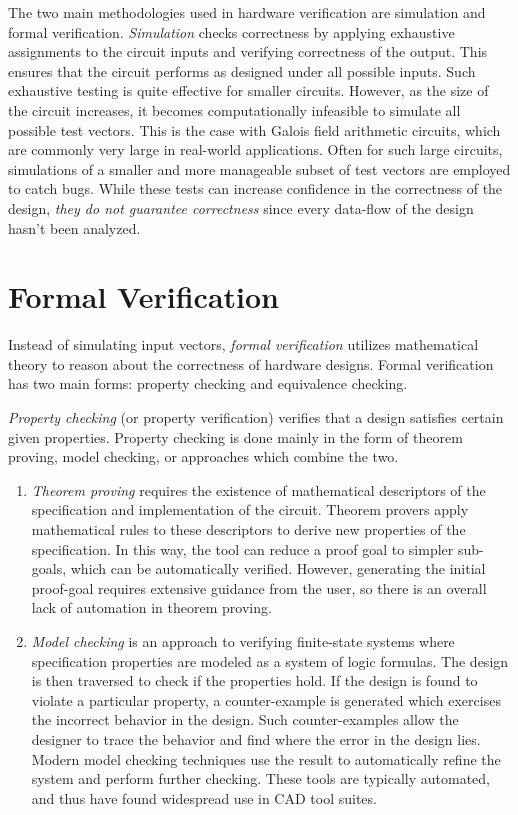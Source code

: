 The two main methodologies used in hardware verification are simulation and 
formal verification. \emph{Simulation} checks correctness by applying exhaustive 
assignments to the circuit inputs and verifying correctness of the output. 
This ensures that the circuit performs as designed under all possible 
inputs. Such exhaustive testing is quite effective for smaller circuits. 
However, as the size of the circuit increases, it becomes 
computationally infeasible to simulate all possible test vectors. This is the 
case with Galois field arithmetic circuits, which are commonly very large in 
real-world applications. Often for such large circuits, simulations of a smaller and more 
manageable subset of test vectors are employed to catch bugs. While these tests
can increase confidence in the correctness of the design,  
{\it they do not guarantee correctness} since every data-flow of the design hasn't
been analyzed.

\section{Formal Verification}
Instead of simulating input vectors, \emph{formal verification} utilizes 
mathematical theory to reason about the correctness of hardware designs.
Formal verification has two main forms: property checking and equivalence 
checking. 

{\it Property checking} (or property verification) verifies
that a design satisfies certain given properties. Property checking is done mainly 
in the form of theorem proving, model checking, or approaches which 
combine the two.
\begin{enumerate}
\item \emph{Theorem proving} \cite{theoremproving:91} requires the existence of
mathematical descriptors of the specification and implementation of the 
circuit. Theorem provers apply mathematical rules to these descriptors to
derive new properties of the specification. In this way, the tool can reduce
a proof goal to simpler sub-goals, which can be automatically verified.
However, generating the initial proof-goal requires extensive guidance from
the user, so there is an overall lack of automation in theorem 
proving.
\item \emph{Model checking} \cite{modelcheck:99} is an approach
to verifying finite-state systems where specification 
properties are modeled as a system of 
logic formulas. The design is then traversed to check if the 
properties hold. If the design is found to violate a
particular property, a counter-example is generated which exercises the
incorrect behavior in the design. Such counter-examples allow the designer
to trace the behavior and find where the error in the design lies.
Modern model checking techniques use the result to automatically refine
the system and perform further checking.
These tools are typically automated, and thus have found widespread 
use in CAD tool suites.
\end{enumerate}

